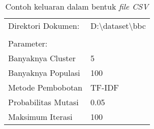 \begin{table}[H]
\caption{Contoh keluaran dalam bentuk \textit{file CSV}}
\begin{tabular}{lllll}
Direktori Dokumen:                                 & \multicolumn{4}{l}{D:\textbackslash{}dataset\textbackslash{}bbc} \\
                                                   &                                                                &                                                       &                                                        &                                                       \\
Parameter:                                         &                                                                &                                                       &                                                        &                                                       \\ \cline{1-2}
\multicolumn{1}{|l|}{Banyaknya Cluster}            & \multicolumn{1}{l|}{5}                                         &                                                       &                                                        &                                                       \\ \cline{1-2}
\multicolumn{1}{|l|}{Banyaknya Populasi}           & \multicolumn{1}{l|}{100}                                       &                                                       &                                                        &                                                       \\ \cline{1-2}
\multicolumn{1}{|l|}{Metode Pembobotan}            & \multicolumn{1}{l|}{TF-IDF}                                    &                                                       &                                                        &                                                       \\ \cline{1-2}
\multicolumn{1}{|l|}{Probabilitas Mutasi}          & \multicolumn{1}{l|}{0.05}                                      &                                                       &                                                        &                                                       \\ \cline{1-2}
\multicolumn{1}{|l|}{Maksimum Iterasi}             & \multicolumn{1}{l|}{100}                                       &                                                       &                                                        &                                                       \\ \cline{1-2}

\end{tabular}
\end{table}
